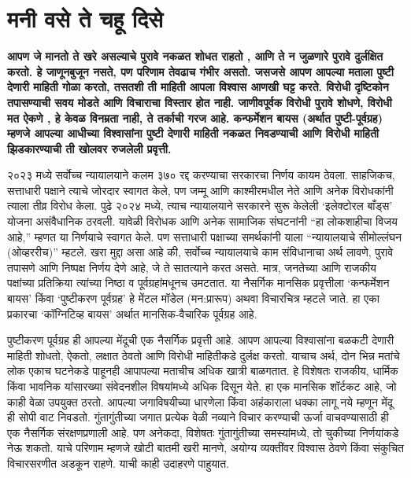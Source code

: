 \chapter{मनी वसे ते चहू दिसे }

\textcolor{blue!60!black}{\textbf{आपण जे मानतो ते खरे असल्याचे पुरावे नकळत शोधत राहतो , आणि ते न जुळणारे पुरावे दुर्लक्षित करतो. हे जाणूनबुजून नसते, पण परिणाम तेवढाच गंभीर असतो. जसजसे आपण आपल्या मताला पुष्टी देणारी माहिती गोळा करतो, तसतशी ती माहिती आपला विश्वास आणखी घट्ट करते. विरोधी दृष्टिकोन तपासण्याची सवय मोडते आणि विचाराचा विस्तार होत नाही. जाणीवपूर्वक विरोधी पुरावे शोधणे, विरोधी मत ऐकणे , हे केवळ विनम्रता नाही, ते तर्काची गरज आहे. कन्फर्मेशन बायस (अर्थात पुष्टी-पूर्वग्रह) म्हणजे आपल्या आधीच्या विश्वासांना पुष्टी देणारी माहिती नकळत निवडण्याची आणि विरोधी माहिती झिडकारण्याची ती खोलवर रुजलेली प्रवृत्ती.}}

२०२३ मध्ये सर्वोच्च न्यायालयाने कलम ३७० रद्द करण्याचा सरकारचा निर्णय कायम ठेवला. साहजिकच, सत्ताधारी पक्षाने त्याचे जोरदार स्वागत केले, पण जम्मू आणि काश्मीरमधील नेते आणि अनेक विरोधकांनी त्याला तीव्र विरोध केला. पुढे २०२४ मध्ये, त्याच न्यायालयाने सरकारने सुरू केलेली ‘इलेक्टोरल बाँड्स’ योजना असंवैधानिक ठरवली. यावेळी विरोधक आणि अनेक सामाजिक संघटनांनी “हा लोकशाहीचा विजय आहे,” म्हणत या निर्णयाचे स्वागत केले. पण सत्ताधारी पक्षाच्या समर्थकांनी याला “न्यायालयाचे सीमोल्लंघन (ओव्हररीच)” म्हटले. खरा मुद्दा असा आहे की, सर्वोच्च न्यायालयाचे काम संविधानाचा अर्थ लावणे, पुरावे तपासणे आणि निष्पक्ष निर्णय देणे आहे, जे ते सातत्याने करत असते. मात्र, जनतेच्या आणि राजकीय पक्षांच्या प्रतिक्रिया त्यांच्या निष्ठा व पूर्वग्रहांमधूनच उमटतात. या नैसर्गिक मानसिक प्रवृत्तीला ‘कन्फर्मेशन बायस’ किंवा ‘पुष्टीकरण पूर्वग्रह’ हे मेंटल मॉडेल (मन:प्रारूप) अथवा विचारचित्र म्हटले जाते. हा एका प्रकारचा ‘कॉग्निटिव्ह बायस’ अर्थात मानसिक-वैचारिक पूर्वग्रह आहे.

पुष्टीकरण पूर्वग्रह ही आपल्या मेंदूची एक नैसर्गिक प्रवृत्ती आहे. आपण आपल्या विश्वासांना बळकटी देणारी माहिती शोधतो, ऐकतो, लक्षात ठेवतो आणि विरोधी माहितीकडे दुर्लक्ष करतो. याचाच अर्थ, दोन भिन्न मतांचे लोक एकाच घटनेकडे पाहूनही आपापल्या मताचीच अधिक खात्री बाळगतात. हे विशेषतः राजकीय, धार्मिक किंवा भावनिक यांसारख्या संवेदनशील विषयांमध्ये अधिक दिसून येते. हा एक मानसिक शॉर्टकट आहे, जो काही वेळा उपयुक्त ठरतो. आपल्या जगाविषयीच्या धारणेला किंवा अहंकाराला धक्का लागू नये म्हणून मेंदू ही सोपी वाट निवडतो. गुंतागुंतीच्या जगात प्रत्येक वेळी नव्याने विचार करण्याची ऊर्जा वाचवण्यासाठी ही एक नैसर्गिक संरक्षणप्रणाली आहे. पण अनेकदा, विशेषतः गुंतागुंतीच्या समस्यांमध्ये, तो चुकीच्या निर्णयांकडे नेऊ शकतो. याचे परिणाम म्हणजे खोटी बातमी खरी मानणे, अयोग्य व्यक्तींवर विश्वास ठेवणे किंवा संकुचित विचारसरणीत अडकून राहणे. याची काही उदाहरणे पाहुयात.

